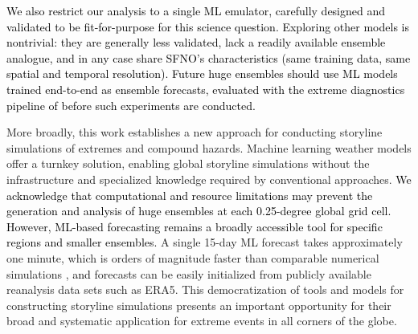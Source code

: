 \documentclass[draft]{agujournal2019}
\renewcommand{\st}[1]{\unskip}
\newcommand{\newTxt}{\textcolor{black}}
\begin{document}
\newTxt{We also restrict our analysis to a single ML emulator, carefully designed and validated to be fit-for-purpose for this science question. Exploring other models is nontrivial: they are generally less validated, lack a readily available ensemble analogue, and in any case share SFNO's characteristics (same training data, same spatial and temporal resolution). Future huge ensembles should use ML models trained end-to-end as ensemble forecasts, evaluated with the extreme diagnostics pipeline of \cite{Mahesh2024hugeensemblesidesign} before such experiments are conducted.}


More broadly, this work establishes a new approach for conducting storyline simulations \st{targeting novel classes} of extremes and compound hazards. 
\st{A current major barrier to storyline simulations is that existing methods demand significant programmer expertise and computational resources, limiting their application in regions that lack access to both.} Machine learning weather models offer a turnkey solution, enabling global storyline simulations without the infrastructure and specialized knowledge required by conventional approaches.
\newTxt{We acknowledge that computational and resource limitations may prevent the generation and analysis of huge ensembles at each 0.25-degree global grid cell. However, ML-based forecasting remains a broadly accessible tool for specific regions and smaller ensembles.} \st{For example,} A single 15-day ML forecast \st{from the ML model} takes approximately one minute, which is orders of magnitude faster than comparable numerical simulations \citep{Mahesh2024hugeensemblesidesign},  \st{Furthermore,} \newTxt{and} forecasts can be easily initialized from publicly available reanalysis data sets such as ERA5. This democratization of tools and models for constructing storyline simulations presents an important opportunity for their broad and systematic application for extreme events in all corners of the globe.


\end{document}
